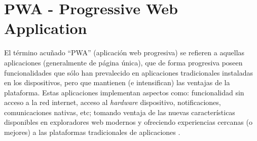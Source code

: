 \section{PWA - Progressive Web Application}

El término acuñado ``PWA'' (aplicación web progresiva) se refieren a aquellas aplicaciones (generalmente de página única), que de forma progresiva poseen funcionalidades que sólo han prevalecido en aplicaciones tradicionales instaladas en los dispositivos, pero que mantienen (e intensifican) las ventajas de la plataforma. Estas aplicaciones implementan aspectos como: funcionalidad sin acceso a la red internet, acceso al \textit{hardware} dispositivo, notificaciones, comunicaciones nativas, etc; tomando ventaja de las nuevas características disponibles en exploradores web modernos y ofreciendo experiencias cercanas (o mejores) a las plataformas tradicionales de aplicaciones \cite{pwa}.
